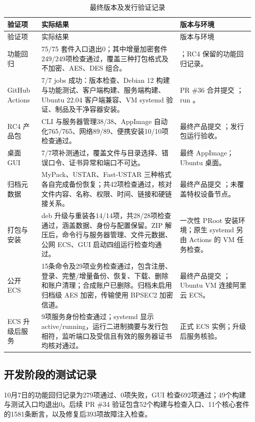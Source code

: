\begin{longtable}{L{.22\linewidth}L{.37\linewidth}L{.32\linewidth}}
\caption{最终版本及发行验证记录}\label{tab:final-validation}\\\toprule 验证项 & 实际结果 & 版本与环境\\\midrule\endfirsthead
\toprule 验证项 & 实际结果 & 版本与环境\\\midrule\endhead
功能回归 & 75/75 套件入口退出0；其中增量加密套件249/249项检查通过，覆盖三种打包格式及不加密、AES、DES 组合。 & ；RC4 保留的功能回归记录。\\
GitHub Actions & 7/7 jobs 成功：版本检查、Debian 12 构建与功能测试、客户端构建、服务端构建、Ubuntu 22.04 客户端兼容、VM systemd 验证、制品及干净容器安装。 & PR \#36 合并提交 ；run 。\\
RC4 产品包 & CLI 与服务器管理38/38、AppImage 自动化765/765、网络89/89、便携安装10/10项检查通过。 & 最终产品提交 ；发行包运行验收。\\
桌面 GUI & 7/7项补测通过，覆盖文件与目录选择、错误口令、证书异常和端口不可达。 & 最终 AppImage；Ubuntu 桌面。\\
归档元数据 & MyPack、USTAR、Fast-USTAR 三种格式各自完成备份恢复；共42项检查通过，核对文件内容、名称、权限、时间、链接和硬链接关系。 & 最终产品提交 ；未覆盖特权设备节点。\\
打包与安装 & deb 升级与重装各14/14项，共28/28项检查通过，涵盖数据、身份与配置保留。ZIP 解压后，命令行与服务器管理、文件元数据、公网 ECS、GUI 启动四组运行检查均通过。 & 一次性 PRoot 安装环境；原生 systemd 另由 Actions 的 VM 任务检查。\\
公开 ECS & 15条命令及29项业务检查通过，包含注册、登录、完整/增量备份、恢复、下载、删除和账户清理；合成账户已删除。归档未启用归档级 AES 加密，传输使用 BPSEC2 加密信道。 & 最终产品提交 ；Ubuntu VM 连接阿里云 ECS。\\
ECS 升级后服务 & 9项服务身份检查通过；systemd 显示 active/running，运行二进制摘要与发行包相符，监听端口及受信且有效的服务器证书均核对通过。 & 正式 ECS 实例；升级后服务核验。\\
\bottomrule\end{longtable}


\subsection{开发阶段的测试记录}
10月7日的功能回归记录为279项通过、0项失败，GUI 检查692项通过；49个构建与测试入口均退出0。后续 PR \#34 验证包含52个构建与检查入口、11个核心套件的1581条断言，以及修复后393项故障注入检查。

